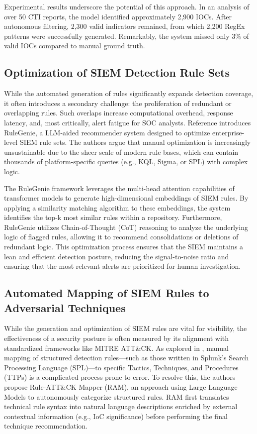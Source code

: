\documentclass[conference]{IEEEtran}
\begin{document}
Experimental results underscore the potential of this approach. 
In an analysis of over 50 CTI reports, the model identified approximately 2,900 IOCs. After autonomous filtering, 2,300 valid indicators remained, 
from which 2,200 RegEx patterns were successfully generated. Remarkably, the system missed only 3\% of valid IOCs compared to manual ground truth. 

\subsection{Optimization of SIEM Detection Rule Sets}
While the automated generation of rules significantly expands detection coverage, it often introduces a secondary challenge: the proliferation of redundant or overlapping rules. 
Such overlaps increase computational overhead, response latency, and, most critically, alert fatigue for SOC analysts. 
Reference \cite{b10} introduces RuleGenie, a LLM-aided recommender system designed to optimize enterprise-level SIEM rule sets. 
The authors argue that manual optimization is increasingly unsustainable due to the sheer scale of modern rule bases, 
which can contain thousands of platform-specific queries (e.g., KQL, Sigma, or SPL) with complex logic.

The RuleGenie framework leverages the multi-head attention capabilities of transformer models to generate high-dimensional embeddings of SIEM rules. 
By applying a similarity matching algorithm to these embeddings, the system identifies the top-k most similar rules within a repository. 
Furthermore, RuleGenie utilizes Chain-of-Thought (CoT) reasoning to analyze the underlying logic of flagged rules, allowing it to recommend consolidations 
or deletions of redundant logic. This optimization process ensures that the SIEM maintains a lean and efficient detection posture, 
reducing the signal-to-noise ratio and ensuring that the most relevant alerts are prioritized for human investigation.

\subsection{Automated Mapping of SIEM Rules to Adversarial Techniques}\label{sec:cti_end}
While the generation and optimization of SIEM rules are vital for visibility, the effectiveness of a security posture is often measured by its alignment with 
standardized frameworks like MITRE ATT\&CK. As explored in \cite{b11}, manual mapping of structured detection rules—such as those written 
in Splunk’s Search Processing Language (SPL)—to specific Tactics, Techniques, and Procedures (TTPs) is a complicated process prone to error. 
To resolve this, the authors propose Rule-ATT\&CK Mapper (RAM), an approach using Large Language Models to autonomously categorize structured rules. 
RAM first translates technical rule syntax into natural language descriptions enriched by 
external contextual information (e.g., IoC significance) before performing the final technique recommendation.
\end{document}
